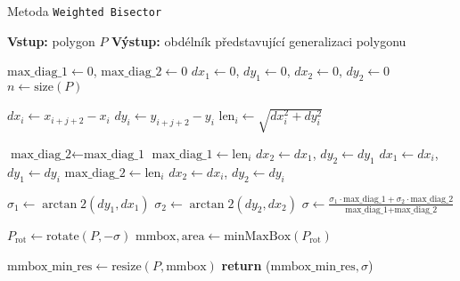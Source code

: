 \begin{algorithm}
    \caption{Metoda \texttt{Weighted Bisector}}
    \begin{algorithmic}[1]
        \STATE \textbf{Vstup:} polygon $P$
        \STATE \textbf{Výstup:} obdélník představující generalizaci polygonu
        
        \STATE $\text{max\_diag\_1} \gets 0$, $\text{max\_diag\_2} \gets 0$
        \STATE $dx_1 \gets 0$, $dy_1 \gets 0$, $dx_2 \gets 0$, $dy_2 \gets 0$
        \STATE $n \gets \text{size}(P)$
        
                \STATE $dx_i \gets x_{i+j+2} - x_i$
                \STATE $dy_i \gets y_{i+j+2} - y_i$
                \STATE $\text{len}_i \gets \sqrt{dx_i^2 + dy_i^2}$
                
                    \STATE $\text{max\_diag\_2} \gets \text{max\_diag\_1}$
                    \STATE $\text{max\_diag\_1} \gets \text{len}_i$
                    \STATE $dx_2 \gets dx_1$, $dy_2 \gets dy_1$
                    \STATE $dx_1 \gets dx_i$, $dy_1 \gets dy_i$
                    \STATE $\text{max\_diag\_2} \gets \text{len}_i$
                    \STATE $dx_2 \gets dx_i$, $dy_2 \gets dy_i$
                \ENDIF
            \ENDFOR
        \ENDFOR
        
        \STATE $\sigma_1 \gets \arctan2(dy_1, dx_1)$
        \STATE $\sigma_2 \gets \arctan2(dy_2, dx_2)$
        \STATE $\sigma \gets \frac{\sigma_1 \cdot \text{max\_diag\_1} + \sigma_2 \cdot \text{max\_diag\_2}}{\text{max\_diag\_1} + \text{max\_diag\_2}}$
        
        \STATE $P_{\text{rot}} \gets \text{rotate}(P, -\sigma)$
        \STATE $\text{mmbox}, \text{area} \gets \text{minMaxBox}(P_{\text{rot}})$
        
        \STATE $\text{mmbox\_min\_res} \gets \text{resize}(P, \text{mmbox})$
        \STATE \textbf{return} ($\text{mmbox\_min\_res}, \sigma$)
    \end{algorithmic}
\end{algorithm}